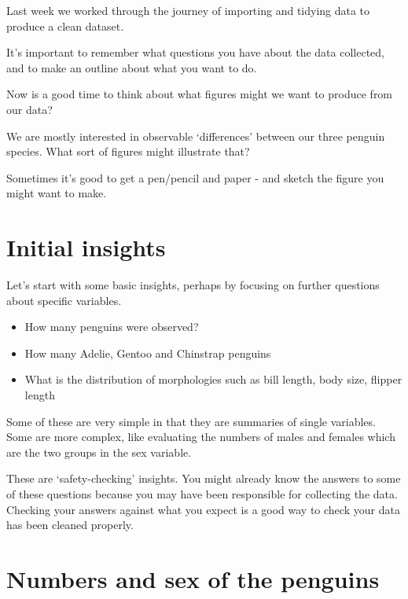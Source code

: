 \documentclass[
]{book}
\makeatletter
\newenvironment{kframe}{%
\medskip{}
\setlength{\fboxsep}{.8em}
 \def\at@end@of@kframe{}%
 \ifinner\ifhmode%
  \def\at@end@of@kframe{\end{minipage}}%
  \begin{minipage}{\columnwidth}%
 \fi\fi%
 \def\FrameCommand##1{\hskip\@totalleftmargin \hskip-\fboxsep
 \colorbox{shadecolor}{##1}\hskip-\fboxsep
     \hskip-\linewidth \hskip-\@totalleftmargin \hskip\columnwidth}%
 \MakeFramed {\advance\hsize-\width
   \@totalleftmargin\z@ \linewidth\hsize
   \@setminipage}}%
 {\par\unskip\endMakeFramed%
 \at@end@of@kframe}
\newenvironment{block}[1]
  {
  \begin{itemize}
  \renewcommand{\labelitemi}{
    \raisebox{-.7\height}[0pt][0pt]{
      {\setkeys{Gin}{width=3em,keepaspectratio}\texttt{[image: images/\#1]}}
    }
  }
  \setlength{\fboxsep}{1em}
  \begin{kframe}
  \item
  }
  {
  \end{kframe}
  \end{itemize}
  }
\newenvironment{rmdquestion}
  {\begin{block}{question}}
  {\end{block}}
\makeatother
\begin{document}
Last week we worked through the journey of importing and tidying data to produce a clean dataset.

It's important to remember what questions you have about the data collected, and to make an outline about what you want to do.

\begin{rmdquestion}
Now is a good time to think about what figures might we want to produce
from our data?

We are mostly interested in observable `differences' between our three
penguin species. What sort of figures might illustrate that?

Sometimes it's good to get a pen/pencil and paper - and sketch the
figure you might want to make.
\end{rmdquestion}

\hypertarget{initial-insights}{%
\section{Initial insights}\label{initial-insights}}

Let's start with some basic insights, perhaps by focusing on further questions about specific variables.

\begin{itemize}
\item
  How many penguins were observed?
\item
  How many Adelie, Gentoo and Chinstrap penguins
\item
  What is the distribution of morphologies such as bill length, body size, flipper length
\end{itemize}

Some of these are very simple in that they are summaries of single variables. Some are more complex, like evaluating the numbers of males and females which are the two groups in the sex variable.

These are `safety-checking' insights. You might already know the answers to some of these questions because you may have been responsible for collecting the data. Checking your answers against what you expect is a good way to check your data has been cleaned properly.

\hypertarget{numbers-and-sex-of-the-penguins}{%
\section{Numbers and sex of the penguins}\label{numbers-and-sex-of-the-penguins}}
\end{document}
